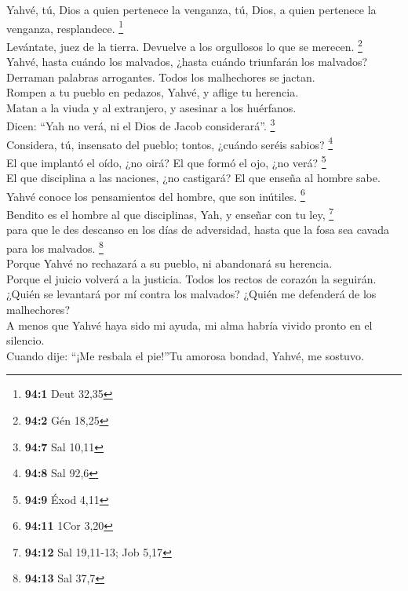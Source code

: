 Yahvé, tú, Dios a quien pertenece la venganza, tú, Dios,
a quien pertenece la venganza, resplandece. \footnote{\textbf{94:1} Deut
  32,35}\\
 Levántate, juez de la tierra. Devuelve a los orgullosos
lo que se merecen. \footnote{\textbf{94:2} Gén 18,25}\\
 Yahvé, hasta cuándo los malvados, ¿hasta cuándo
triunfarán los malvados?\\
 Derraman palabras arrogantes. Todos los malhechores se
jactan.\\
 Rompen a tu pueblo en pedazos, Yahvé, y aflige tu
herencia.\\
 Matan a la viuda y al extranjero, y asesinar a los
huérfanos.\\
 Dicen: ``Yah no verá, ni el Dios de Jacob considerará''.
\footnote{\textbf{94:7} Sal 10,11}\\
 Considera, tú, insensato del pueblo; tontos, ¿cuándo
seréis sabios? \footnote{\textbf{94:8} Sal 92,6}\\
 El que implantó el oído, ¿no oirá? El que formó el ojo,
¿no verá? \footnote{\textbf{94:9} Éxod 4,11}\\
 El que disciplina a las naciones, ¿no castigará? El que
enseña al hombre sabe.\\
 Yahvé conoce los pensamientos del hombre, que son
inútiles. \footnote{\textbf{94:11} 1Cor 3,20}\\
 Bendito es el hombre al que disciplinas, Yah, y enseñar
con tu ley, \footnote{\textbf{94:12} Sal 19,11-13; Job 5,17}\\
 para que le des descanso en los días de adversidad,
hasta que la fosa sea cavada para los malvados. \footnote{\textbf{94:13}
  Sal 37,7}\\
 Porque Yahvé no rechazará a su pueblo, ni abandonará su
herencia.\\
 Porque el juicio volverá a la justicia. Todos los rectos
de corazón la seguirán.\\
 ¿Quién se levantará por mí contra los malvados? ¿Quién
me defenderá de los malhechores?\\
 A menos que Yahvé haya sido mi ayuda, mi alma habría
vivido pronto en el silencio.\\
 Cuando dije: ``¡Me resbala el pie!''Tu amorosa bondad,
Yahvé, me sostuvo.\\
